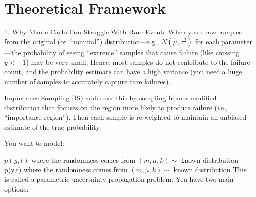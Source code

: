 \chapter{Theoretical Framework}
\label{ch:theory}

1. Why Monte Carlo Can Struggle With Rare Events
When you draw samples from the original (or “nominal”) distribution—e.g., 
$N(\mu, \sigma^2)$ for each parameter—the probability of seeing “extreme” samples that cause failure (like crossing 
$y < -1$) may be very small. Hence, most samples do not contribute to the failure count, and the probability estimate can have a high variance (you need a huge number of samples to accurately capture rare failures).

Importance Sampling (IS) addresses this by sampling from a modified distribution that focuses on the region more likely to produce failure (i.e., “importance region”). Then each sample is re-weighted to maintain an unbiased estimate of the true probability.


You want to model:

$p(y,t)$ where the randomness comes from $(m,\mu,k) \sim$ known distribution
p(y,t) where the randomness comes from $(m,\mu,k) \sim$ known distribution
This is called a parametric uncertainty propagation problem. You have two main options: